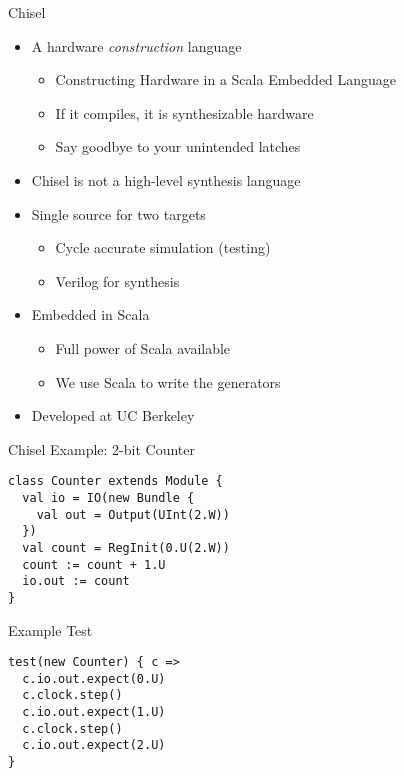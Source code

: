 \begin{frame}[fragile]{Chisel}
\begin{itemize}
\item A hardware \emph{construction} language
\begin{itemize}
\item Constructing Hardware in a Scala Embedded Language
\item If it compiles, it is synthesizable hardware 
\item Say goodbye to your unintended latches
\end{itemize}
\item Chisel is not a high-level synthesis language
\item Single source for two targets
\begin{itemize}
\item Cycle accurate simulation (testing)
\item Verilog for synthesis
\end{itemize}
\item Embedded in Scala
\begin{itemize}
\item Full power of Scala available
\item We use Scala to write the generators
\end{itemize}
\item Developed at UC Berkeley
\end{itemize}
\end{frame}




\begin{frame}[fragile]{Chisel Example: 2-bit Counter}
\begin{verbatim}
class Counter extends Module {
  val io = IO(new Bundle {
    val out = Output(UInt(2.W))
  })
  val count = RegInit(0.U(2.W))
  count := count + 1.U
  io.out := count
}
\end{verbatim}
\end{frame}

\begin{frame}[fragile]{Example Test}
\begin{verbatim}
test(new Counter) { c =>
  c.io.out.expect(0.U)
  c.clock.step()
  c.io.out.expect(1.U)
  c.clock.step()
  c.io.out.expect(2.U)
}
\end{verbatim}
\end{frame}



